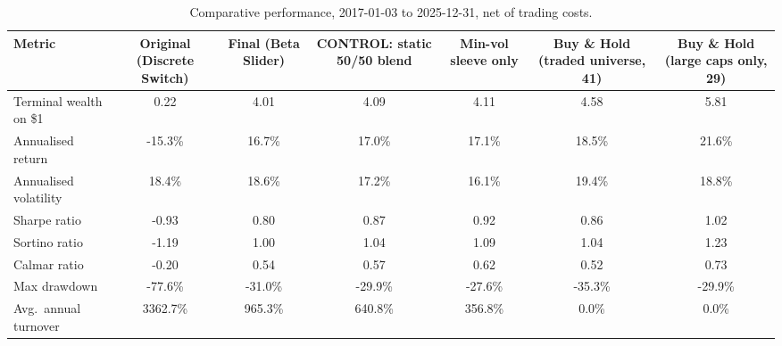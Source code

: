 \begin{table}[H]
\centering
\caption{Comparative performance, 2017-01-03 to 2025-12-31, net of trading costs.}
\label{tab:main}
\begin{tabular}{@{}lcccccc@{}}
\toprule
Metric & Original (Discrete Switch) & Final (Beta Slider) & CONTROL: static 50/50 blend & Min-vol sleeve only & Buy \& Hold (traded universe, 41) & Buy \& Hold (large caps only, 29) \\
\midrule
Terminal wealth on \$1 & 0.22 & 4.01 & 4.09 & 4.11 & 4.58 & 5.81 \\
Annualised return & -15.3\% & 16.7\% & 17.0\% & 17.1\% & 18.5\% & 21.6\% \\
Annualised volatility & 18.4\% & 18.6\% & 17.2\% & 16.1\% & 19.4\% & 18.8\% \\
Sharpe ratio & -0.93 & 0.80 & 0.87 & 0.92 & 0.86 & 1.02 \\
Sortino ratio & -1.19 & 1.00 & 1.04 & 1.09 & 1.04 & 1.23 \\
Calmar ratio & -0.20 & 0.54 & 0.57 & 0.62 & 0.52 & 0.73 \\
Max drawdown & -77.6\% & -31.0\% & -29.9\% & -27.6\% & -35.3\% & -29.9\% \\
Avg.\ annual turnover & 3362.7\% & 965.3\% & 640.8\% & 356.8\% & 0.0\% & 0.0\% \\
\bottomrule
\end{tabular}
\end{table}
